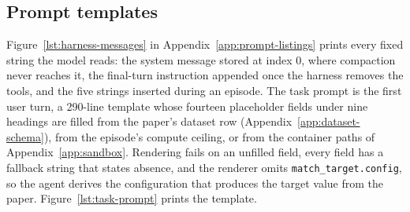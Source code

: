\subsection{Prompt templates}
\label{app:prompts}

Figure~\ref{lst:harness-messages} in Appendix~\ref{app:prompt-listings} prints
every fixed string the model reads: the system message stored at index 0,
where compaction never reaches it, the final-turn instruction appended once
the harness removes the tools, and the five strings inserted during an
episode. The task prompt is the first user turn, a 290-line template whose
fourteen placeholder fields under nine headings are filled from the paper's
dataset row (Appendix~\ref{app:dataset-schema}), from the episode's compute
ceiling, or from the container paths of Appendix~\ref{app:sandbox}. Rendering
fails on an unfilled field, every field has a fallback string that states
absence, and the renderer omits \texttt{match\_target.config}, so the agent
derives the configuration that produces the target value from the paper.
Figure~\ref{lst:task-prompt} prints the template.
